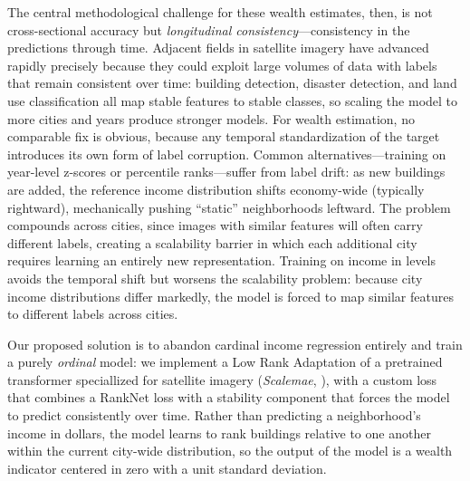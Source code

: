 \documentclass[conference]{IEEEtran}
\begin{document}
The central methodological challenge for these wealth estimates, then, is not cross-sectional accuracy but \emph{longitudinal consistency}---consistency in the predictions through time. Adjacent fields in satellite imagery have advanced rapidly precisely because they could exploit large volumes of data with labels that remain consistent over time: building detection, disaster detection, and land use classification all map stable features to stable classes, so scaling the model to more cities and years produce stronger models. For wealth estimation, no comparable fix is obvious, because any temporal standardization of the target introduces its own form of label corruption. Common alternatives—training on year-level z-scores or percentile ranks—suffer from label drift: as new buildings are added, the reference income distribution shifts economy-wide (typically rightward), mechanically pushing ``static'' neighborhoods leftward. The problem compounds across cities, since images with similar features will often carry different labels, creating a scalability barrier in which each additional city requires learning an entirely new representation. Training on income in levels avoids the temporal shift but worsens the scalability problem: because city income distributions differ markedly, the model is forced to map similar features to different labels across cities.

Our proposed solution is to abandon cardinal income regression entirely and train a purely \emph{ordinal} model: we implement a Low Rank Adaptation of a pretrained transformer speciallized for satellite imagery (\textit{Scalemae}, \citet{reed2023scalemae}), with a custom loss that combines a RankNet loss \citep{parikh2011relative} with a stability component that forces the model to predict consistently over time. Rather than predicting a neighborhood's income in dollars, the model learns to rank buildings relative to one another within the current city-wide distribution, so the output of the model is a wealth indicator centered in zero with a unit standard deviation. 
\end{document}
